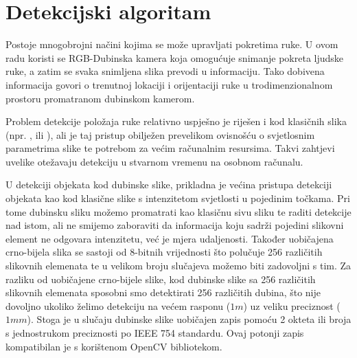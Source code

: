 \documentclass[times, utf8, diplomski, numeric]{fer}
\begin{document}
%
%

\chapter{Detekcijski algoritam}\label{Detekcijski algoritam}
Postoje mnogobrojni načini kojima se može upravljati pokretima ruke. U ovom radu koristi se RGB-Dubinska kamera koja omogućuje snimanje pokreta ljudske ruke, a zatim se svaka snimljena slika prevodi u informaciju. Tako dobivena informacija govori o trenutnoj lokaciji i orijentaciji ruke u trodimenzionalnom prostoru promatranom dubinskom kamerom.

Problem detekcije položaja ruke relativno uspješno je riješen i kod klasičnih slika (npr. \cite{de2011model}, \cite{stenger2001model} ili \cite{rehg1994visual}), ali je taj pristup obilježen prevelikom ovisnošću o svjetlosnim parametrima slike te potrebom za većim računalnim resursima. Takvi zahtjevi uvelike otežavaju detekciju u stvarnom vremenu na osobnom računalu.

U detekciji objekata kod dubinske slike, prikladna je većina pristupa detekciji objekata kao kod klasične slike s intenzitetom svjetlosti u pojedinim točkama. Pri tome dubinsku sliku možemo promatrati kao klasičnu sivu sliku te raditi detekcije nad istom, ali ne smijemo zaboraviti da informacija koju sadrži pojedini slikovni element ne odgovara intenzitetu, već je mjera udaljenosti. Također uobičajena crno-bijela slika se sastoji od 8-bitnih vrijednosti što polučuje 256 različitih slikovnih elemenata te u velikom broju slučajeva možemo biti zadovoljni s tim. Za razliku od uobičajene crno-bijele slike, kod dubinske slike sa 256 različitih slikovnih elemenata sposobni smo detektirati 256 različitih dubina, što nije dovoljno ukoliko želimo detekciju na većem rasponu ($1m$) uz veliku preciznost ($1mm$). Stoga je u slučaju dubinske slike uobičajen zapis pomoću 2 okteta ili broja s jednostrukom preciznosti po IEEE 754 standardu. Ovaj potonji zapis kompatibilan je s korištenom OpenCV bibliotekom.
\end{document}
